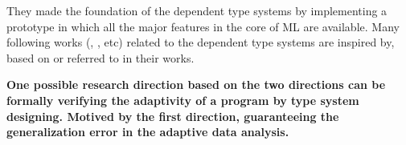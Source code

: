 \documentclass{article}
\begin{document}
They made the foundation of the dependent type systems by implementing a prototype in which all the major features in the core of ML are available. Many following works (\cite{near2019duet}, \cite{gaboardi2013linear}, \cite{reed2010distance} etc) related to the dependent type systems are inspired by, based on or referred to in their works. 

\textbf{One possible research direction based on the two directions can be formally verifying the adaptivity of a program by type system designing. Motived by the first direction, guaranteeing the generalization error in the adaptive data analysis.
}

\newpage


\end{document}
